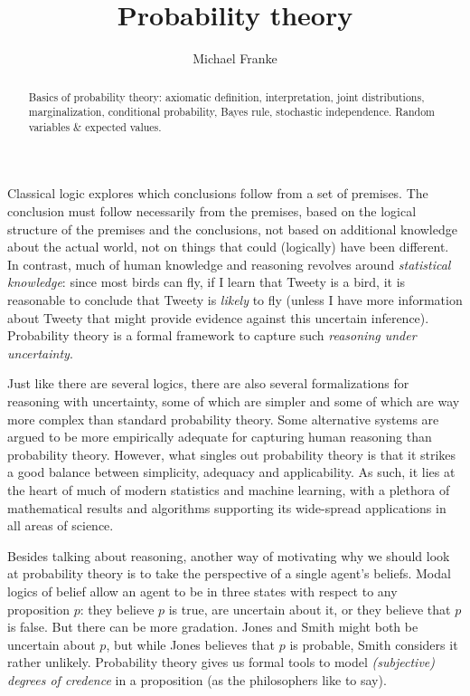 \documentclass[nobib,nofonts]{tufte-handout}
\title{Probability theory}
\author[M.~Franke]{Michael Franke}
\date{} %
\begin{document}
\maketitle

\begin{abstract}
\noindent
Basics of probability theory:
axiomatic definition,
interpretation,
joint distributions,
marginalization,
conditional probability,
Bayes rule,
stochastic independence.
Random variables \& expected values.
\end{abstract}


\noindent Classical logic explores which conclusions follow from a set of premises.
The conclusion must follow necessarily from the premises, based on the logical structure of the premises and the conclusions, not based on additional knowledge about the actual world, not on things that could (logically) have been different.
In contrast, much of human knowledge and reasoning revolves around \emph{statistical knowledge}: since most birds can fly, if I learn that Tweety is a bird, it is reasonable to conclude that Tweety is \emph{likely} to fly (unless I have more information about Tweety that might provide evidence against this uncertain inference).
Probability theory is a formal framework to capture such \emph{reasoning under uncertainty}.

Just like there are several logics, there are also several formalizations for reasoning with uncertainty, some of which are simpler and some of which are way more complex than standard probability theory.
Some alternative systems are argued to be more empirically adequate for capturing human reasoning than probability theory.
However, what singles out probability theory is that it strikes a good balance between simplicity, adequacy and applicability.
As such, it lies at the heart of much of modern statistics and machine learning, with a plethora of mathematical results and algorithms supporting its wide-spread applications in all areas of science.

Besides talking about reasoning, another way of motivating why we should look at probability theory is to take the perspective of a single agent's beliefs.
Modal logics of belief allow an agent to be in three states with respect to any proposition $p$: they believe $p$ is true, are uncertain about it, or they believe that $p$ is false.
But there can be more gradation.
Jones and Smith might both be uncertain about $p$, but while Jones believes that $p$ is probable, Smith considers it rather unlikely.
Probability theory gives us formal tools to model \emph{(subjective) degrees of credence} in a proposition (as the philosophers like to say).
\end{document}

